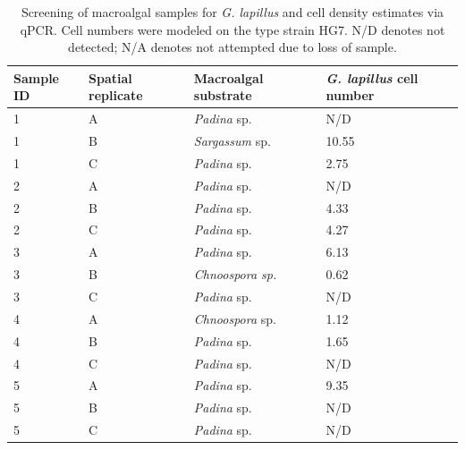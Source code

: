\documentclass[12pt]{article}
\begin{document}
\begin{longtable}{ | p{2cm} | p{2cm} | p{3cm} | p{3.5cm} |}
\caption{Screening of macroalgal samples for \emph{G. lapillus} and cell density estimates via qPCR. Cell numbers were modeled on the type strain HG7. N/D denotes not detected; N/A denotes not attempted due to loss of sample.}\\ %
\hline
\label{tbl:MacroalgaeTable}
\textbf{Sample ID}&\textbf{Spatial replicate}&\textbf{Macroalgal substrate}&\textbf{\textit{G. lapillus} cell number}\\%
\hline
1&A&\emph{Padina} sp.&N/D\\
\hline
1&B&\emph{Sargassum} sp.&10.55
\\
\hline
1&C&\emph{Padina} sp.&2.75
\\
\hline
2&A&\emph{Padina} sp.&N/D\\
\hline
2&B&\emph{Padina} sp. %
&4.33\\
\hline
2&C&\emph{Padina} sp.&4.27\\
\hline
3&A&\emph{Padina} sp. %
&6.13 %
\\
\hline
3&B&\emph{Chnoospora sp.}&0.62
\\
\hline
3&C&\emph{Padina} sp. %
&N/D\\
\hline
4&A&\emph{Chnoospora} sp.&1.12 %
\\
\hline
4&B&\emph{Padina} sp.&1.65
\\
\hline
4&C&\emph{Padina} sp.&N/D\\
\hline
5
&A&\emph{Padina} sp.&9.35\\
\hline
5
&B&\emph{Padina} sp.&N/D\\
\hline
5
&C&\emph{Padina} sp.&N/D\\
\hline

\end{longtable}
\end{document}
